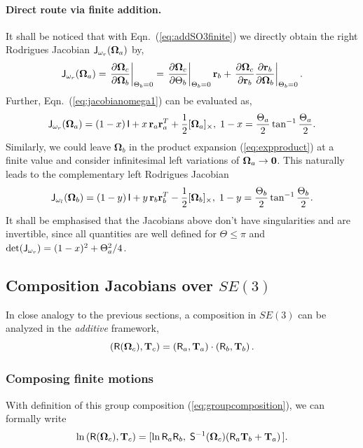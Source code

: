 \documentclass[conference]{IEEEtran}
\newcommand{\bfOmega}{\boldsymbol{\Omega}}
\newcommand{\beq}{\begin{equation}}
\newcommand{\eeq}{\end{equation}}
\begin{document}
\begin{appendix}
\paragraph{Direct route via finite addition.}
It shall be noticed that with Eqn.~(\ref{eq:addSO3finite})
we directly obtain the right Rodrigues Jacobian ${\sf J}_{\omega_r}(\bfOmega_a)$ by,
\beq
    {\sf J}_{\omega_r}(\bfOmega_a) = 
    \left.{\partial \bfOmega_c \over \partial \bfOmega_b}\right|_{\Theta_b=0}=
    \left.{\partial \bfOmega_c \over \partial \Theta_b}\right|_{\Theta_b=0} {\bf r}_b+
    \left.{\partial \bfOmega_c \over \partial {\bf r}_b} {\partial {\bf r}_b \over \partial \bfOmega_b}
    \right|_{\Theta_b=0}. \label{eq:jacobianomega1}
\eeq
Further, Eqn.~(\ref{eq:jacobianomega1}) can be evaluated as,
\beq
    {\sf J}_{\omega_r}(\bfOmega_a) = (1-x)\, {\sf I}+ x\, {\bf r}_a{\bf r}_a^T + {1\over 2}[\bfOmega_a]_\times,
    \; 1-x = {\Theta_a\over 2}\tan^{-1}{\Theta_a\over 2}.
    \label{eq:RodweinormanJ}
\eeq
Similarly, we could leave $\bfOmega_b$ in the product expansion (\ref{eq:expproduct}) at a finite value
and consider infinitesimal left variations of $\bfOmega_a\rightarrow {\bf 0}$. This naturally leads to the
complementary left Rodrigues Jacobian
\beq
    {\sf J}_{\omega_l} (\bfOmega_b) = (1-y)\, {\sf I}+ y\, {\bf r}_b{\bf r}_b^T - {1\over 2}[\bfOmega_b]_\times,
    \; 1-y = {\Theta_b\over 2}\tan^{-1}{\Theta_b\over 2}.
\eeq
It shall be emphasised that the Jacobians above don't have singularities and are invertible, since all quantities
are well defined for $\Theta\leq\pi$ and $\mathrm{det}( {\sf J}_{\omega_r}) = (1-x)^2 + \Theta_a^2/4$.

\subsection{Composition Jacobians over $SE(3)$}
\label{app:SE3composition}
In close analogy to the previous sections, a composition in $SE(3)$ can be analyzed
in the {\em additive} framework,
\beq
    ({\sf R}(\bfOmega_c),{\bf T}_c)=({\sf R}_a,{\bf T}_a)\cdot
    ({\sf R}_b,{\bf T}_b)\, .
\eeq

\subsubsection{Composing finite motions}
With definition of this group composition (\ref{eq:groupcomposition}), we can formally write
\beq
    \ln \, ({\sf R}(\bfOmega_c),{\bf T}_c) = [\ln {\sf R}_a{\sf R}_b,\;
    {\sf S}^{-1}(\bfOmega_c) ({\sf R}_a{\bf T}_b + {\bf T}_a) \, ].
    \label{eq:addfiniteSE3}
\eeq


\end{appendix}
\end{document}
